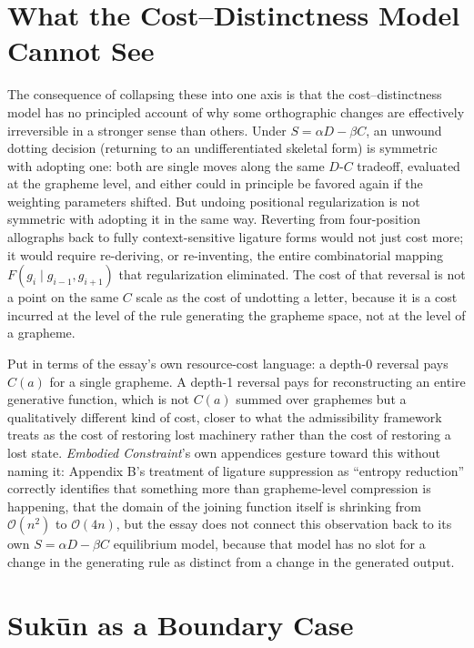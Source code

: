 \documentclass[11pt]{article}
\begin{document}
\section{What the Cost--Distinctness Model Cannot See}

The consequence of collapsing these into one axis is that the
cost--distinctness model has no principled account of why some orthographic
changes are effectively irreversible in a stronger sense than others. Under
$S = \alpha D - \beta C$, an unwound dotting decision (returning to an
undifferentiated skeletal form) is symmetric with adopting one: both are
single moves along the same $D$-$C$ tradeoff, evaluated at the grapheme
level, and either could in principle be favored again if the weighting
parameters shifted. But undoing positional regularization is not symmetric
with adopting it in the same way. Reverting from four-position allographs
back to fully context-sensitive ligature forms would not just cost more; it
would require re-deriving, or re-inventing, the entire combinatorial
mapping $F(g_i \mid g_{i-1}, g_{i+1})$ that regularization eliminated. The
cost of that reversal is not a point on the same $C$ scale as the cost of
undotting a letter, because it is a cost incurred at the level of the rule
generating the grapheme space, not at the level of a grapheme.

Put in terms of the essay's own resource-cost language: a depth-0 reversal
pays $C(a)$ for a single grapheme. A depth-1 reversal pays for reconstructing
an entire generative function, which is not $C(a)$ summed over graphemes but
a qualitatively different kind of cost, closer to what the admissibility
framework treats as the cost of restoring lost machinery rather than the
cost of restoring a lost state. \emph{Embodied Constraint}'s own appendices
gesture toward this without naming it: Appendix B's treatment of ligature
suppression as \textquotedblleft entropy reduction\textquotedblright{}
correctly identifies that something more than grapheme-level compression is
happening, that the domain of the joining function itself is shrinking from
$\mathcal{O}(n^2)$ to $\mathcal{O}(4n)$, but the essay does not connect this
observation back to its own $S = \alpha D - \beta C$ equilibrium model,
because that model has no slot for a change in the generating rule as
distinct from a change in the generated output.

\section{Sukūn as a Boundary Case}
\end{document}
